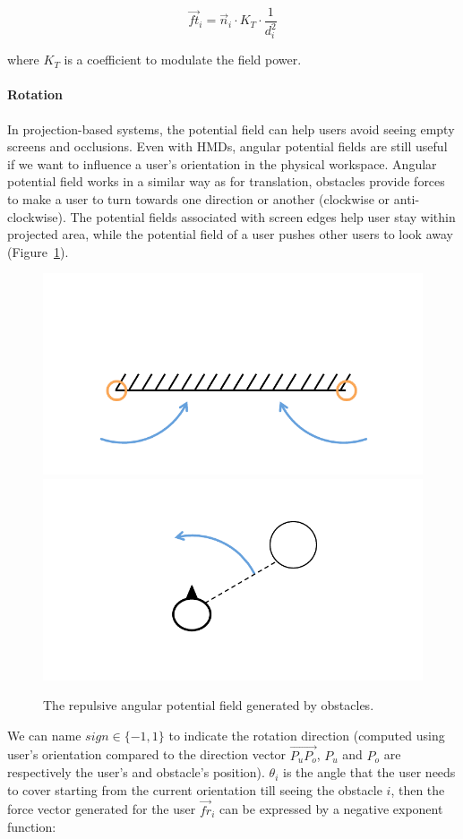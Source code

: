 \begin{equation}
\overrightarrow{ft}_{i}=\overrightarrow{n}_{i} \cdot K_{T} \cdot \frac{1}{d_{i}^2}
\end{equation}

where $K_{T}$ is a coefficient to modulate the field power.

\paragraph{Rotation}
In projection-based systems, the potential field can help users avoid seeing empty screens and occlusions. Even with HMDs, angular potential fields are still useful if we want to influence a user's orientation in the physical workspace. Angular potential field works in a similar way as for translation, obstacles provide forces to make a user to turn towards one direction or another (clockwise or anti-clockwise). The potential fields associated with screen edges help user stay within projected area, while the potential field of a user pushes other users to look away (Figure~\ref{fig:5_pf_r}).

\begin{figure}[htb]
  \centering
  \includegraphics[width=.49\textwidth]{figures/ch5/pf_r_wall}
  \includegraphics[width=.49\textwidth]{figures/ch5/pf_r_user}
  \caption{\label{fig:5_pf_r}The repulsive angular potential field generated by obstacles.}
\end{figure}

We can name $sign \in \{-1, 1\}$ to indicate the rotation direction (computed using user's orientation compared to the direction vector $\overrightarrow{P_{u}P_{o}}$, $P_{u}$ and $P_{o}$ are respectively the user's and obstacle's position). $\theta_{i}$ is the angle that the user needs to cover starting from the current orientation till seeing the obstacle $i$, then the force vector generated for the user $\overrightarrow{fr}_{i}$ can be expressed by a negative exponent function:

